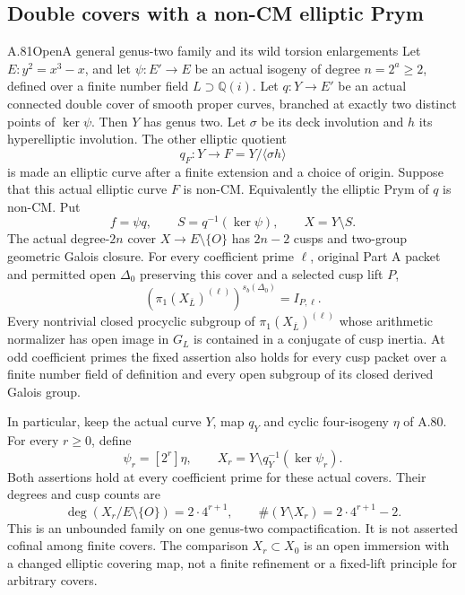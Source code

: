 \subsection{Double covers with a non-CM elliptic Prym}

\begin{statement}{A.81}{Open}{A general genus-two family and its wild torsion enlargements}
Let \(E:y^2=x^3-x\), and let
\(\psi:E'\to E\) be an actual isogeny of degree
\(n=2^a\ge2\), defined over a finite number field \(L\supset\mathbb Q(i)\).
Let \(q:Y\to E'\) be an actual connected double cover
of smooth proper curves, branched at exactly two distinct
points of \(\ker\psi\). Then \(Y\) has genus two.
Let \(\sigma\) be its deck involution and \(h\) its
hyperelliptic involution. The other elliptic quotient
\[
                  q_F:Y\longrightarrow F=Y/\langle\sigma h\rangle
                                                        \tag{A.81.1}
\]
is made an elliptic curve after a finite extension and a
choice of origin. Suppose that this actual elliptic curve
\(F\) is non-CM. Equivalently the elliptic Prym of \(q\)
is non-CM. Put
\[
       f=\psi q,\qquad S=q^{-1}(\ker\psi),\qquad X=Y\setminus S.
                                                        \tag{A.81.2}
\]
The actual degree-\(2n\) cover \(X\to E\setminus\{O\}\)
has \(2n-2\) cusps and two-group geometric Galois closure.
For every coefficient prime \(\ell\), original Part A packet
and permitted open \(\Delta_0\) preserving this cover and a
selected cusp lift \(P\),
\[
 \left(\pi_1(X_{\overline L})^{(\ell)}\right)^{s_b(\Delta_0)}
                              =I_{P,\ell}.             \tag{A.81.2a}
\]
Every nontrivial closed procyclic subgroup of
\(\pi_1(X_{\overline L})^{(\ell)}\) whose arithmetic
normalizer has open image in \(G_L\) is contained in a
conjugate of cusp inertia.
At odd coefficient primes the fixed assertion also holds
for every cusp packet over a finite number field of definition
and every open subgroup of its closed derived Galois group.

In particular, keep the actual curve \(Y\), map \(q_Y\)
and cyclic four-isogeny \(\eta\) of A.80. For every
\(r\ge0\), define
\[
 \psi_r=[2^r]\eta,\qquad
 X_r=Y\setminus q_Y^{-1}(\ker\psi_r).
                                                        \tag{A.81.3}
\]
Both assertions hold at every coefficient prime for these
actual covers. Their degrees and cusp counts are
\[
              \deg(X_r/E\setminus\{O\})=2\cdot4^{r+1},
              \qquad \#(Y\setminus X_r)=2\cdot4^{r+1}-2.
                                                        \tag{A.81.4}
\]
This is an unbounded family on one genus-two compactification.
It is not asserted cofinal among finite covers. The comparison
\(X_r\subset X_0\) is an open immersion with a changed
elliptic covering map, not a finite refinement or a fixed-lift
principle for arbitrary covers.
\end{statement}

